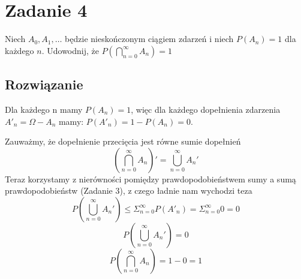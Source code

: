 \section{Zadanie 4}
Niech \(A_0, A_1, \dots\) będzie nieskończonym ciągiem zdarzeń i
niech \(P(A_n) = 1\) dla każdego \(n\).
Udowodnij, że \(P(\bigcap_{n=0}^{\infty}A_n) = 1\)

\subsection*{Rozwiązanie}
Dla każdego n mamy \(P(A_n) = 1\), więc dla każdego dopełnienia zdarzenia \(A'_n = \Omega - A_n\) mamy:
\(P(A'_n) = 1 - P(A_n) = 0\).

Zauważmy, że dopełnienie przecięcia jest równe sumie dopełnień
\[
	(\bigcap_{n=0}^{\infty}A_n)' = \bigcup_{n=0}^{\infty}A_n'
\]
Teraz korzystamy z nierówności pomiędzy prawdopodobieństwem sumy a sumą prawdopodobieństw (Zadanie 3),
z czego ładnie nam wychodzi teza
\[
	P(\bigcup_{n=0}^{\infty}A_n') \leq \Sigma_{n=0}^{\infty}P(A'_n) = \Sigma_{n=0}^{\infty}0 = 0
\]
\[
	P(\bigcup_{n=0}^{\infty}A_n') = 0
\]
\[
	P(\bigcap_{n=0}^{\infty}A_n) = 1 - 0 = 1
\]
